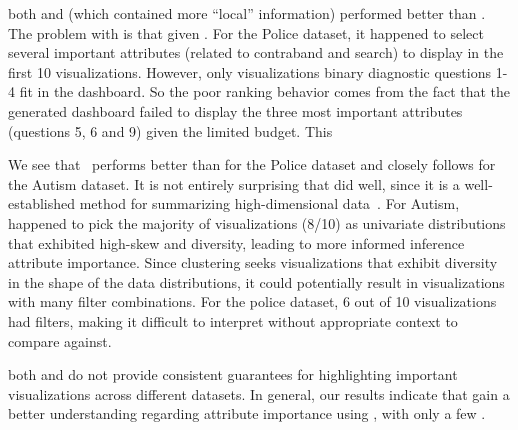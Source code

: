 \par
{}
both \system and \cluster (which contained more ``local'' information)
performed better than \BFS. The problem with \BFS is that given .%
For the Police dataset, it happened to select several
important attributes (related to contraband and search)
to display in the first 10 visualizations.
However, 
only visualizations 
binary diagnostic
questions 1-4 fit in the dashboard.
So the poor ranking behavior comes from the fact that
the \BFS generated dashboard failed to display
the three most important attributes (questions 5, 6 and 9)
given the limited budget.
This 

\par We see that \system\ performs better
than \cluster for the Police dataset
and closely follows \cluster for the Autism dataset.
It is not entirely surprising that \cluster did well,
since it is a well-established method for
summarizing high-dimensional data~\cite{Han2005}.
For Autism, \cluster happened to pick the majority of visualizations (8/10) as univariate distributions that exhibited high-skew and diversity,
leading to more informed inference  attribute importance.
Since clustering seeks visualizations
that exhibit diversity in the shape of the data distributions,
it could potentially result in visualizations with many filter combinations.
For the police dataset, 6 out of 10 visualizations had
 filters,
making it difficult to interpret 
without  appropriate context to compare against.

\par {} both \BFS and \cluster
do not provide consistent guarantees for highlighting important visualizations across different datasets. In general, our results indicate that  gain a better  understanding regarding attribute importance using \system, with only a few .

